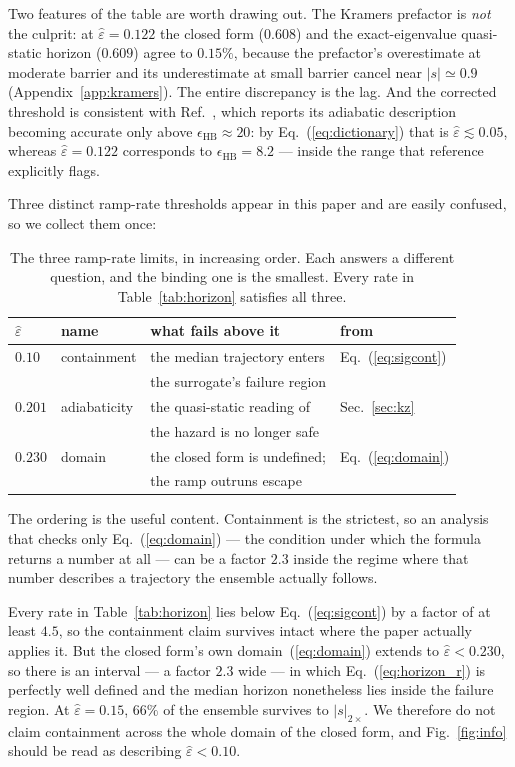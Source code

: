 \documentclass[%
 twocolumn,
 superscriptaddress,
 amsmath,amssymb,
 aps,
 pre,
 floatfix,
]{revtex4-2}
\newcommand{\Sig}{\hat\varepsilon}
\begin{document}
Two features of the table are worth drawing out.  The Kramers prefactor is \emph{not} the culprit: at $\Sig=0.122$ the closed form ($0.608$) and the exact-eigenvalue quasi-static horizon ($0.609$) agree to $0.15\%$, because the prefactor's overestimate at moderate barrier and its underestimate at small barrier cancel near $|s|\simeq0.9$ (Appendix~\ref{app:kramers}).  The entire discrepancy is the lag.  And the corrected threshold is consistent with Ref.~\cite{HerbertBouchet2017}, which reports its adiabatic description becoming accurate only above $\epsilon_{\mathrm{HB}}\approx20$: by Eq.~(\ref{eq:dictionary}) that is $\Sig\lesssim0.05$, whereas $\Sig=0.122$ corresponds to $\epsilon_{\mathrm{HB}}=8.2$ --- inside the range that reference explicitly flags.

Three distinct ramp-rate thresholds appear in this paper and are easily confused, so we collect them once:
\begin{table}[b]
\caption{\label{tab:thresholds}%
The three ramp-rate limits, in increasing order.  Each answers a different question, and the binding one is the smallest.  Every rate in Table~\ref{tab:horizon} satisfies all three.}
\begin{ruledtabular}
\begin{tabular}{llll}
$\Sig$ & name & what fails above it & from \\
\hline
$0.10$  & containment & the median trajectory enters & Eq.~(\ref{eq:sigcont}) \\
        &             & the surrogate's failure region & \\
$0.201$ & adiabaticity & the quasi-static reading of & Sec.~\ref{sec:kz} \\
        &              & the hazard is no longer safe & \\
$0.230$ & domain & the closed form is undefined; & Eq.~(\ref{eq:domain}) \\
        &        & the ramp outruns escape & \\
\end{tabular}
\end{ruledtabular}
\end{table}
The ordering is the useful content.  Containment is the strictest, so an analysis that checks only Eq.~(\ref{eq:domain}) --- the condition under which the formula returns a number at all --- can be a factor $2.3$ inside the regime where that number describes a trajectory the ensemble actually follows.

Every rate in Table~\ref{tab:horizon} lies below Eq.~(\ref{eq:sigcont}) by a factor of at least $4.5$, so the containment claim survives intact where the paper actually applies it.  But the closed form's own domain~(\ref{eq:domain}) extends to $\Sig<0.230$, so there is an interval --- a factor $2.3$ wide --- in which Eq.~(\ref{eq:horizon_r}) is perfectly well defined and the median horizon nonetheless lies inside the failure region.  At $\Sig=0.15$, $66\%$ of the ensemble survives to $|s|_{2\times}$.  We therefore do not claim containment across the whole domain of the closed form, and Fig.~\ref{fig:info} should be read as describing $\Sig<0.10$.
\end{document}
